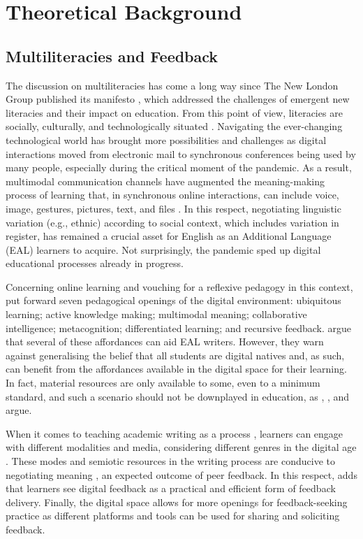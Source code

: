 \documentclass[english]{textolivre}
\begin{document}
\section{Theoretical Background}

\subsection{Multiliteracies and Feedback}

The discussion on multiliteracies has come a long way since The New London Group published its manifesto \cite{newlondon1996}, which addressed the challenges of emergent new literacies and their impact on education. From this point of view, literacies are socially, culturally, and technologically situated \cite{santos2021kersch}. Navigating the ever-changing technological world has brought more possibilities and challenges as digital interactions moved from electronic mail to synchronous conferences being used by many people, especially during the critical moment of the pandemic. As a result, multimodal communication channels have augmented the meaning-making process of learning \cite{elola2017writing} that, in synchronous online interactions, can include voice, image, gestures, pictures, text, and files \cite{belda2021enhancing}. In this respect, negotiating linguistic variation (e.g., ethnic) according to social context, which includes variation in register, has remained a crucial asset for English as an Additional Language (EAL) learners to acquire. Not surprisingly, the pandemic sped up digital educational processes already in progress.

Concerning online learning and vouching for a reflexive pedagogy in this context, \textcite{cope2013towards, cope2017learning} put forward seven pedagogical openings of the digital environment: ubiquitous learning; active knowledge making; multimodal meaning; collaborative intelligence; metacognition; differentiated learning; and recursive feedback. \textcite{elola2017writing} argue that several of these affordances can aid EAL writers. However, they warn against generalising the belief that all students are digital natives and, as such, can benefit from the affordances available in the digital space for their learning. In fact, material resources are only available to some, even to a minimum standard, and such a scenario should not be downplayed in education, as \textcite{belda2021enhancing}, \textcite{oliveira2020conteudo}, and \textcite{de2020uso} argue.

When it comes to teaching academic writing as a process \cite{hyland2006feedback}, learners can engage with different modalities and media, considering different genres in the digital age \cite{elola2017writing}. These modes and semiotic resources in the writing process are conducive to negotiating meaning \cite{cheung2022verbal}, an expected outcome of peer feedback. In this respect, \textcite{bakla2020extensive} adds that learners see digital feedback as a practical and efficient form of feedback delivery. Finally, the digital space allows for more openings for feedback-seeking practice as different platforms and tools can be used for sharing and soliciting feedback.
\end{document}
